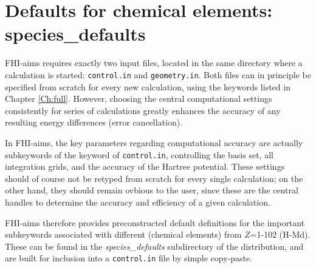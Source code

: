 \section{Defaults for chemical elements: species\_defaults}
\label{Sec:species}

FHI-aims requires exactly two input files, located in the same directory where
a calculation is started: \texttt{control.in} and \texttt{geometry.in}. Both
files can
in principle be specified from scratch for every new calculation, using the
keywords listed in Chapter \ref{Ch:full}. However, choosing the central
computational settings consistently for series of calculations greatly
enhances the accuracy of any resulting energy differences (error cancellation).

In FHI-aims, the key parameters regarding computational accuracy are actually
subkeywords of the  keyword of \texttt{control.in},
controlling the basis set, all integration grids, and the accuracy of the
Hartree potential. These settings should of course not be retyped from scratch
for every single calculation; on the other hand, they should remain ovbious
to the user, since these are the central handles to determine the accuracy and
efficiency of a given calculation. 

FHI-aims therefore provides preconstructed default definitions for the
important subkeywords associated with different  (chemical
elements) from $Z$=1-102 (H-Md). These can be found in the
\emph{species\_defaults} subdirectory of the distribution, and are built for
inclusion into a \texttt{control.in} file by simple copy-paste. 

